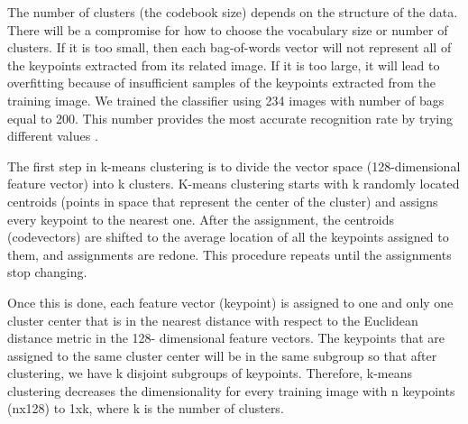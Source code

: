 The number of clusters (the codebook size) depends on the structure of 
the data. There will be a compromise for how to choose the vocabulary size or number of 
clusters. If it is too small, then each bag-of-words vector will not represent all of the keypoints 
extracted from its related image. If it is too large, it will lead to overfitting because of insufficient 
samples of the keypoints extracted from the training image. 
We trained the classifier using 234 images with number of bags equal to 200. This number provides the most accurate recognition rate by trying different values \cite{Dardas11}.

\bigskip
The first step in k-means clustering is to divide the vector space (128-dimensional feature 
vector) into k clusters. K-means clustering starts with k randomly located centroids (points in space that represent the center of the cluster) and assigns every keypoint to the nearest one. After 
the assignment, the centroids (codevectors) are shifted to the average location of all the 
keypoints assigned to them, and assignments are redone. This procedure repeats until the 
assignments stop changing.

\bigskip
Once this is done, each feature vector (keypoint) is assigned to one and only one cluster 
center that is in the nearest distance with respect to the Euclidean distance metric in the 128-
dimensional feature vectors. The keypoints that are assigned to the same cluster center will be in 
the same subgroup so that after clustering, we have k disjoint subgroups of keypoints. Therefore, 
k-means clustering decreases the dimensionality for every training image with n keypoints 
(nx128) to 1xk, where k is the number of clusters.


